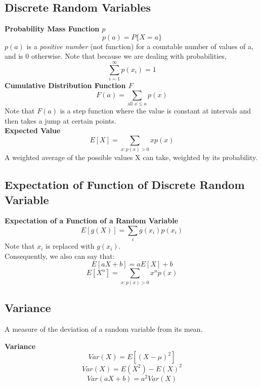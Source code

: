 \documentclass[10pt,a4paper]{article}
\begin{document}
        \subsection{Discrete Random Variables}
            \begin{framed}
                \centering\textbf{Probability Mass Function $p$}
                $$p(a) = P\{X = a\}$$ 
                $p(a)$ is a \emph{positive number} (not function) for a countable number of values of a, and is $0$ otherwise.
                Note that because we are dealing with probabilities,
                $$\sum_{i=1}^{\infty}p(x_    i) = 1$$
                \centering\textbf{Cumulative Distribution Function $F$}
                $$F(a) = \sum_{\text{all } x \leq a} p(x)$$
                Note that $F(a)$ is a step function where the value is constant at intervals and then takes a jump at certain points. \\
                \centering\textbf{Expected Value}
                $$E[X] = \sum_{x:p(x) > 0} xp(x)$$
                A weighted average of the possible values X can take, weighted by its probability.
            \end{framed}
            \newpage
        \subsection{Expectation of Function of Discrete Random Variable}
        \begin{framed}
            \centering\textbf{Expectation of a Function of a Random Variable}
                $$E[g(X)] = \sum_ig(x_i)p(x_i)$$
                Note that $x_i$ is replaced with $g(x_i)$. \\
                Consequently, we also can say that: 
                $$E[aX + b] = aE[X] + b $$
                $$E[X^n] = \sum_{x:p(x)>0}x^np(x)$$
        \end{framed}
        
        \subsection{Variance}
        A measure of the deviation of a random variable from its mean.
       \begin{framed}
       	\centering\textbf{Variance}
       	    $$Var(X) = E[(X-\mu)^{2}]$$ 
       	    $$Var(X) = E(X^{2}) - E(X)^{2}$$
       	    $$Var(aX + b) = a^{2}Var(X)$$
       \end{framed}
\end{document}
